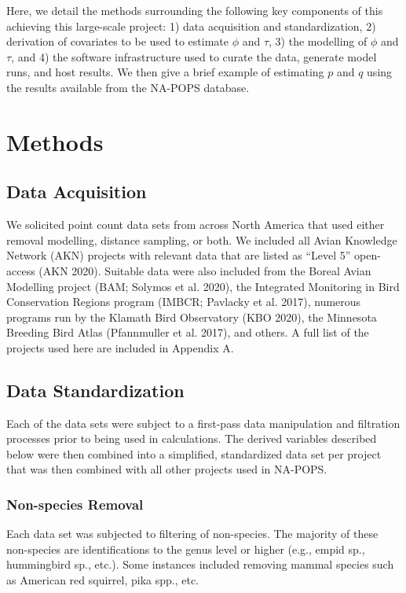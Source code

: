 \documentclass[]{article}
\begin{document}
Here, we detail the methods surrounding the following key components of this achieving this large-scale project: 1) data acquisition and standardization, 2) derivation of covariates to be used to estimate $\phi$ and $\tau$, 3) the modelling of $\phi$ and $\tau$, and 4) the software infrastructure used to curate the data, generate model runs, and host results. We then give a brief example of estimating $p$ and $q$ using the results available from the NA-POPS database.

\section{Methods}
\subsection{Data Acquisition}
 We solicited point count data sets from across North America that used either removal modelling, distance sampling, or both. We included all Avian Knowledge Network (AKN) projects with relevant data that are listed as “Level 5” open-access (AKN 2020). Suitable data were also included from the Boreal Avian Modelling project (BAM; Solymos et al. 2020), the Integrated Monitoring in Bird Conservation Regions program (IMBCR; Pavlacky et al. 2017), numerous programs run by the Klamath Bird Observatory (KBO 2020), the Minnesota Breeding Bird Atlas (Pfannmuller et al. 2017), and others. A full list of the projects used here are included in Appendix A.
 
\subsection{Data Standardization}
Each of the data sets were subject to a first-pass data manipulation and filtration processes prior to being used in calculations. The derived variables described below were then combined into a simplified, standardized data set per project that was then combined with all other projects used in NA-POPS.

\subsubsection{Non-species Removal}
Each data set was subjected to filtering of non-species. The majority of these non-species are identifications to the genus level or higher (e.g., empid sp., hummingbird sp., etc.). Some instances included removing mammal species such as American red squirrel, pika spp., etc. 
\end{document}
